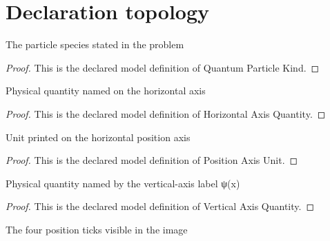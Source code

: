 \section{Declaration topology}
\begin{definition}
  \label{def:physics:phyx-mini-0647:phyxminiproblems-problemphyxmini0647-quantumparticlekind}
  The particle species stated in the problem
\end{definition}
\begin{proof}
  This is the declared model definition of Quantum Particle Kind.
\end{proof}
\begin{definition}
  \label{def:physics:phyx-mini-0647:phyxminiproblems-problemphyxmini0647-horizontalaxisquantity}
  Physical quantity named on the horizontal axis
\end{definition}
\begin{proof}
  This is the declared model definition of Horizontal Axis Quantity.
\end{proof}
\begin{definition}
  \label{def:physics:phyx-mini-0647:phyxminiproblems-problemphyxmini0647-positionaxisunit}
  Unit printed on the horizontal position axis
\end{definition}
\begin{proof}
  This is the declared model definition of Position Axis Unit.
\end{proof}
\begin{definition}
  \label{def:physics:phyx-mini-0647:phyxminiproblems-problemphyxmini0647-verticalaxisquantity}
  Physical quantity named by the vertical-axis label ψ(x)
\end{definition}
\begin{proof}
  This is the declared model definition of Vertical Axis Quantity.
\end{proof}
\begin{definition}
  \label{def:physics:phyx-mini-0647:phyxminiproblems-problemphyxmini0647-positiontick}
  The four position ticks visible in the image
\end{definition}

